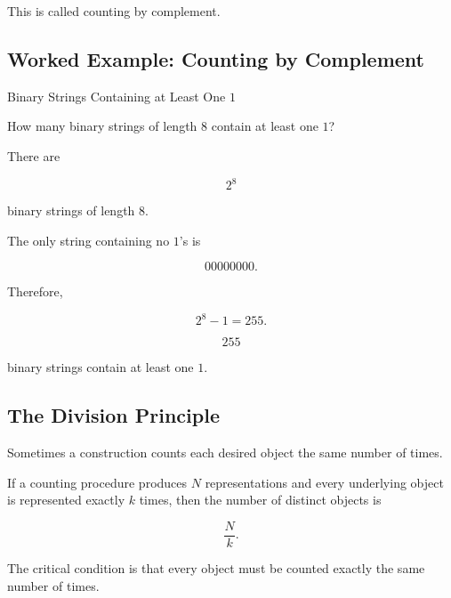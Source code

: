 This is called counting by complement.

\subsection{Worked Example: Counting by Complement}
\label{subsec:worked-counting-complement}

\begin{workedexamplebox}{Binary Strings Containing at Least One \(1\)}

How many binary strings of length \(8\) contain at least one \(1\)?

There are

\[
2^8
\]

binary strings of length \(8\).

The only string containing no \(1\)'s is

\[
00000000.
\]

Therefore,

\[
2^8-1=255.
\]

\begin{answerbox}
\[
\boxed{255}
\]

binary strings contain at least one \(1\).
\end{answerbox}

\end{workedexamplebox}

\subsection{The Division Principle}
\label{subsec:division-principle}

Sometimes a construction counts each desired object the same number of
times.

\begin{theorem}
If a counting procedure produces \(N\) representations and every
underlying object is represented exactly \(k\) times, then the number
of distinct objects is

\[
\boxed{
\frac{N}{k}.
}
\]
\end{theorem}

The critical condition is that every object must be counted exactly the
same number of times.

